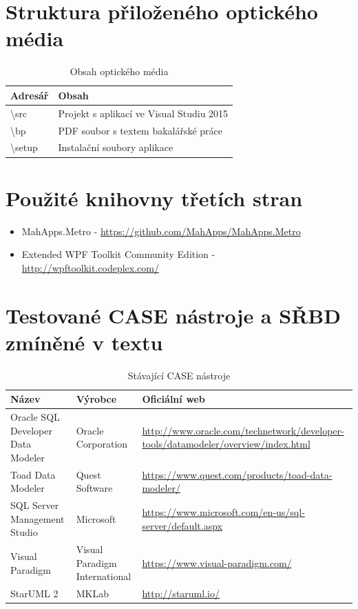 \documentclass[czech,bachelor,public,dept460,male,oneside]{diploma}
\begin{document}
\appendix
\section{Struktura přiloženého optického média}
\begin{table}[h!]
	\centering
	\caption{Obsah optického média}
	\begin{tabular}{l l}
		\toprule
		Adresář & Obsah \\
		\midrule
		\textbackslash src & Projekt s aplikací ve Visual Studiu 2015 \\
		\textbackslash bp & PDF soubor s textem bakalářské práce \\
		\textbackslash setup & Instalační soubory aplikace \\
		\midrule
	\end{tabular}
\end{table}

\section{Použité knihovny třetích stran}
\begin{itemize}
	\item MahApps.Metro - \url{https://github.com/MahApps/MahApps.Metro}
	\item Extended WPF Toolkit Community Edition - \url{http://wpftoolkit.codeplex.com/}
\end{itemize}

\section{Testované CASE nástroje a SŘBD zmíněné v textu} \label{secAddCase}
\begin{table}[h!]
	\centering
	\caption{Stávající CASE nástroje}
	\label{tab:case}
	\begin{tabular}{|p{4cm} | p{4cm} | p{6cm} |}
		\hline
		Název & Výrobce & Oficiální web \\ \hline
		Oracle SQL Developer Data Modeler & Oracle Corporation & \url{http://www.oracle.com/technetwork/developer-tools/datamodeler/overview/index.html} \\ \hline
		Toad Data Modeler & Quest Software & \url{https://www.quest.com/products/toad-data-modeler/} \\ \hline
		SQL Server Management Studio & Microsoft & \url{https://www.microsoft.com/en-us/sql-server/default.aspx} \\ \hline
		Visual Paradigm & Visual Paradigm International & \url{https://www.visual-paradigm.com/} \\ \hline
		StarUML 2 & MKLab & \url{http://staruml.io/} \\
		\hline
	\end{tabular}
\end{table}
\end{document}
